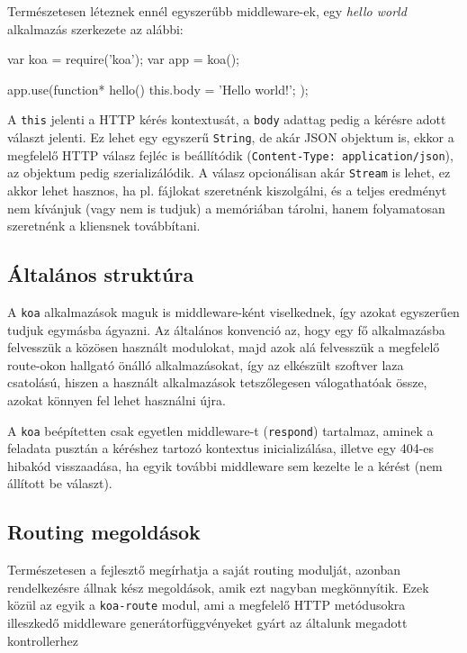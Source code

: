 Természetesen léteznek ennél egyszerűbb middleware-ek, egy \emph{hello world}
alkalmazás szerkezete az alábbi:

\begin{js}
var koa = require('koa');
var app = koa();

app.use(function* hello() {
  this.body = 'Hello world!';
});
\end{js}

A \verb=this= jelenti a HTTP kérés kontextusát, a \verb=body= adattag pedig
a kérésre adott választ jelenti. Ez lehet egy egyszerű \verb=String=, de akár
JSON objektum is, ekkor a megfelelő HTTP válasz fejléc is beállítódik
(\verb=Content-Type: application/json=), az objektum pedig szerializálódik.
A válasz opcionálisan akár \verb=Stream= is lehet, ez akkor lehet hasznos,
ha pl. fájlokat szeretnénk kiszolgálni, és a teljes eredményt nem kívánjuk
(vagy nem is tudjuk) a memóriában tárolni, hanem folyamatosan szeretnénk
a kliensnek továbbítani.

\subsection{Általános struktúra}

A \verb=koa= alkalmazások maguk is middleware-ként viselkednek,
így azokat egyszerűen tudjuk egymásba ágyazni.
Az általános konvenció az, hogy egy fő alkalmazásba felvesszük a közösen
használt modulokat, majd azok alá felvesszük a megfelelő route-okon hallgató
önálló alkalmazásokat, így az elkészült szoftver laza csatolású, hiszen
a használt alkalmazások tetszőlegesen válogathatóak össze, azokat könnyen
fel lehet használni újra.

A \verb=koa= beépítetten csak egyetlen middleware-t (\verb=respond=) tartalmaz,
aminek a feladata pusztán a kéréshez tartozó kontextus inicializálása, illetve
egy 404-es hibakód visszaadása, ha egyik további middleware sem kezelte
le a kérést (nem állított be választ).

\subsection{Routing megoldások}

Természetesen a fejlesztő megírhatja a saját routing modulját,
azonban rendelkezésre állnak kész megoldások, amik ezt nagyban megkönnyítik.
Ezek közül az egyik a \verb=koa-route= modul, ami a megfelelő HTTP
metódusokra illeszkedő middleware generátorfüggvényeket gyárt az általunk
megadott kontrollerhez

